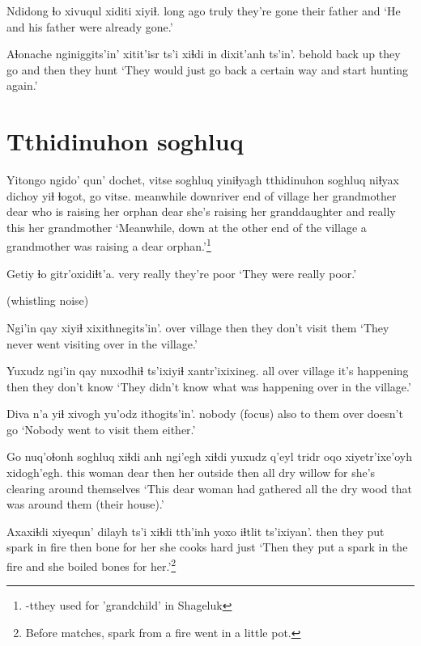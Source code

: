 \documentclass[12pt]{article}
\begin{document}
\gll Ndidong  ɬo    xivuqul xiditi xiyiɬ.
{long ago} truly {they're gone} {their father} and
\glt `He and his father were already gone.'
\glend

\gll Aɬonache nginiggits'in' xitit'isr ts'i xiɬdi {in dixit'anh} ts'in'.
behold   {back up}      {they go} and  then  {they hunt}
\glt `They would just go back a certain way and start hunting again.'
\glend

\section*{Tthidinuhon soghluq}

\gll Yitongo   ngido' {qun' dochet}, vitse           soghluq yiniɬyagh          tthidinuhon soghluq niɬyax dichoy          yiɬ ɬogot,  go   vitse. 
meanwhile downriver {end of village}   {her grandmother} dear    {who is raising her} orphan      dear    {she's raising her} granddaughter and really this {her grandmother    }
\glt `Meanwhile, down at the other end of the village a grandmother was raising a dear orphan.'\footnote{-tthey used for 'grandchild' in Shageluk}
\glend

\gll Getiy ɬo     gitr'oxidiɬt'a.
very  really {they're poor}
\glt `They were really poor.'
\glend

(whistling noise)

\gll Ngi'in qay     xiyiɬ {xixithnegits'in'.}
over   village then  {they don't visit them}
\glt `They never went visiting over in the village.'
\glend

\gll Yuxudz ngi'in qay     nuxodhiɬ       ts'ixiyiɬ xantr'ixixineg.
all    over   village {it's happening} then    {they don't know}
\glt `They didn't know what was happening over in the village.'
\glend

\gll Diva n'a yiɬ  xivogh yu'odz {ithogits'in'.}
nobody {(focus)}  also {to them} over  {doesn't go}
\glt `Nobody went to visit them either.'
\glend

\gll Go   nuq'oɬonh soghluq xiɬdi anh ngi'egh xiɬdi yuxudz {q'eyl tridr} oqo xiyetr'ixe'oyh xidogh'egh.
this woman     dear    then  her outside then  all    {dry willow} for {she's clearing} {around themselves}
\glt `This dear woman had gathered all the dry wood that was around them (their house).'
\glend

\gll Axaxiɬdi {xiyequn' dilayh} ts'i xiɬdi tth'inh yoxo    iɬtlit ts'ixiyan'.  
then     {they put spark in fire} {} then  bone    {for her} {she cooks hard} just
\glt `Then they put a spark in the fire and she boiled bones for her.'\footnote{Before matches, spark from a fire went in a little pot.}
\glend
\end{document}
